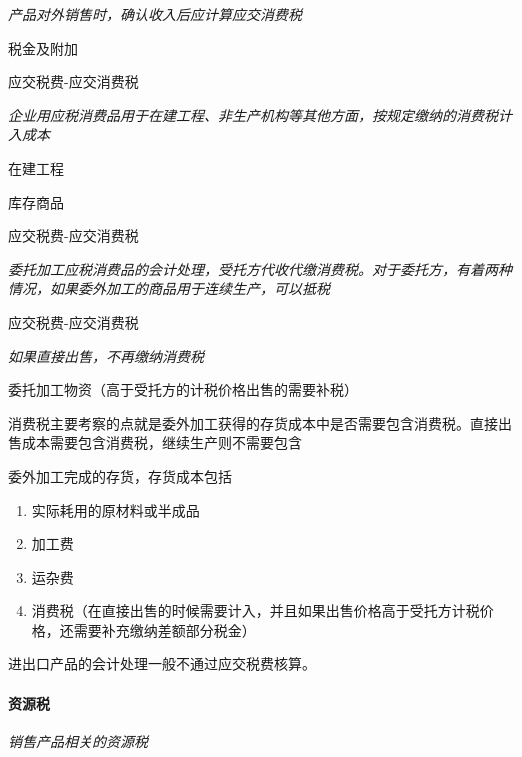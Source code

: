 \documentclass[UTF8,12pt]{ctexart}
\newenvironment{Dr}{%
	\begin{list}{}%
		{
			\setlength{\leftmargin}{2em}
			\setlength{\labelwidth}{2em}
			\setlength{\labelsep}{0pt}
			\setlength{\itemindent}{0pt}
			\setlength{\listparindent}{0pt}
			\setlength{\parsep}{0pt}
			\setlength{\topsep}{0pt}
		}
		\item[\textbf{借：}]
	}{%
	\end{list}
}
\newenvironment{Cr}{%
	\begin{list}{}%
		{
			\setlength{\leftmargin}{3em}
			\setlength{\labelwidth}{2em}
			\setlength{\labelsep}{0pt}
			\setlength{\itemindent}{0pt}
			\setlength{\listparindent}{0pt}
			\setlength{\parsep}{0pt}
			\setlength{\topsep}{0pt}
		}
		\item[\textbf{贷：}]
	}{%
	\end{list}
}
\numberwithin{equation}{section} %
\numberwithin{figure}{section}
\numberwithin{table}{section}
\begin{document}
	\textit{产品对外销售时，确认收入后应计算应交消费税}
	
	\begin{Dr}
		税金及附加
	\end{Dr}
	\begin{Cr}
		应交税费-应交消费税
	\end{Cr}

	\textit{企业用应税消费品用于在建工程、非生产机构等其他方面，按规定缴纳的消费税计入成本}
	
	\begin{Dr}
		在建工程
	\end{Dr}
	\begin{Cr}
		库存商品
		
		应交税费-应交消费税
	\end{Cr}

	\textit{委托加工应税消费品的会计处理，受托方代收代缴消费税。对于委托方，有着两种情况，如果委外加工的商品用于连续生产，可以抵税}
	
	\begin{Dr}
		应交税费-应交消费税
	\end{Dr}

	\textit{如果直接出售，不再缴纳消费税}
	
	\begin{Dr}
		委托加工物资（高于受托方的计税价格出售的需要补税）
	\end{Dr}

	消费税主要考察的点就是委外加工获得的存货成本中是否需要包含消费税。直接出售成本需要包含消费税，继续生产则不需要包含
	
	委外加工完成的存货，存货成本包括
	\begin{enumerate}
		\item 实际耗用的原材料或半成品
		
		\item 加工费
		
		\item 运杂费
		
		\item 消费税（在直接出售的时候需要计入，并且如果出售价格高于受托方计税价格，还需要补充缴纳差额部分税金）
	\end{enumerate}
	
	进出口产品的会计处理一般不通过应交税费核算。
	
	\paragraph{资源税}
	\textit{销售产品相关的资源税}
	
\end{document}
